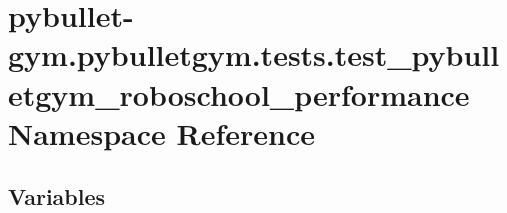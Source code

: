 \hypertarget{namespacepybullet-gym_1_1pybulletgym_1_1tests_1_1test__pybulletgym__roboschool__performance}{}\section{pybullet-\/gym.pybulletgym.\+tests.\+test\+\_\+pybulletgym\+\_\+roboschool\+\_\+performance Namespace Reference}
\label{namespacepybullet-gym_1_1pybulletgym_1_1tests_1_1test__pybulletgym__roboschool__performance}
\subsection*{Variables}
